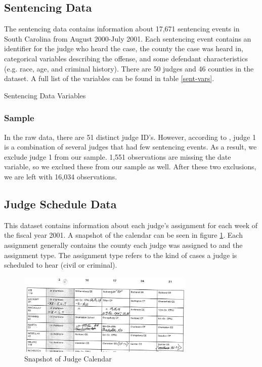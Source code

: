 \documentclass[11pt]{article}
\theoremstyle{ModifiedStyle}
\theoremstyle{ModifiedStyle}
\begin{document}
  \subsection{Sentencing Data}
    The sentencing data contains information about 17,671 sentencing events in South Carolina from August 2000-July 2001. Each sentencing event contains an identifier for the judge who heard the case, the county the case was heard in, categorical variables describing the offense, and some defendant characteristics (e.g. race, age, and criminal history). There are 50 judges and 46 counties in the dataset. A full list of the variables can be found in table \ref{sent-vars}.
    \begin{table}[H]
      \caption{Sentencing Data Variables}
      \label{sent-vars}
      
    \end{table}

    \subsubsection{Sample}
      In the raw data, there are 51 distinct judge ID's. However, according to \cite{hester2017conditional}, judge 1 is a combination of several judges that had few sentencing events. As a result, we exclude judge 1 from our sample. 1,551 observations are missing the date variable, so we exclued these from our sample as well. After these two exclusions, we are left with 16,034 observations.

  \subsection{Judge Schedule Data}
    This dataset contains information about each judge's assignment for each week of the fiscal year 2001. A snapshot of the calendar can be seen in figure \ref{fig-calendar}. Each assignment generally contains the county each judge was assigned to and the assignment type. The assignment type refers to the kind of cases a judge is scheduled to hear (civil or criminal).
    \begin{figure}[h]
        \centering
        \caption{Snapshot of Judge Calendar}
        \label{fig-calendar}
        \includegraphics[width=0.75\textwidth, keepaspectratio=true]{Figures/Fig4.png}
      \end{figure}
\end{document}
